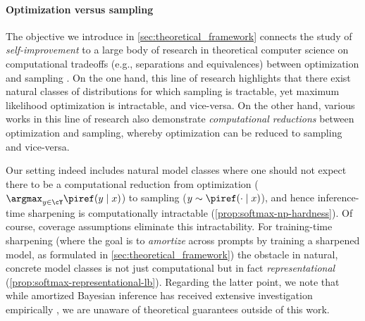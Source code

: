       \paragraph{Optimization versus sampling}
      The \mlsharp objective we introduce in \cref{sec:theoretical_framework} connects
      the study of \emph{self-improvement} to a large body of research in
      theoretical computer science on computational tradeoffs (e.g.,
      separations and equivalences) between
      optimization and sampling      \citep{barahona1982computational,kirkpatrick1983optimization,lovasz2006fast,singh2014entropy,ma2019sampling,talwar2019computational,eldan2022spectral}. On the one hand, this
line of research highlights that there exist natural classes of
distributions for which sampling is tractable, yet
maximum likelihood optimization is intractable, and
vice-versa. On the other hand, various works in this line of research also demonstrate \emph{computational reductions} between
optimization and sampling, whereby optimization can be reduced to
sampling and vice-versa. 

Our setting indeed includes natural model classes where one should not expect there to be a computational reduction from optimization ($\argmax_{y\in\cY}\piref(y\mid{}x)$) to sampling
($y\sim\piref(\cdot\mid{}x)$), and hence inference-time sharpening is computationally intractable (\cref{prop:softmax-np-hardness}). Of course, coverage assumptions eliminate this intractability. For training-time sharpening (where the goal is to \emph{amortize} across prompts by training a sharpened model, as formulated in \cref{sec:theoretical_framework}) the obstacle in natural, concrete model classes is not just computational but in fact \emph{representational} (\cref{prop:softmax-representational-lb}). %
Regarding the latter point, we note that while amortized
Bayesian inference has received extensive investigation empirically
\citep{beal2003variational,gershman2014amortized,swersky2020amortized,bengio2021flow,hu2023amortizing},
we are unaware of theoretical guarantees outside of this work.





